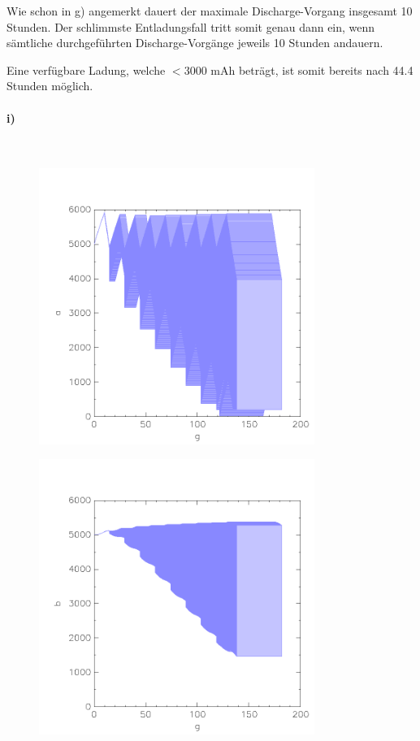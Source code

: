 Wie schon in g) angemerkt dauert der maximale Discharge-Vorgang insgesamt 10 Stunden. Der schlimmste Entladungsfall tritt somit genau dann ein, wenn sämtliche durchgeführten Discharge-Vorgänge jeweils 10 Stunden andauern. 

Eine verfügbare Ladung, welche $< 3000$ mAh beträgt, ist somit bereits nach 44.4 Stunden möglich.


\paragraph{i)}\mbox{} \\

\begin{minipage}[t]{0.5\textwidth} 
	\begin{figure}[H]
		\centering
		\includegraphics[width=0.8\textwidth]{Aufgabe_i1).png}
	\end{figure}
\end{minipage}
\hfill
\begin{minipage}[t]{0.5\textwidth} 
	\begin{figure}[H]
		\centering
		\includegraphics[width=0.8\textwidth]{Aufgabe_i2).png}
	\end{figure}
\end{minipage}\\ 

